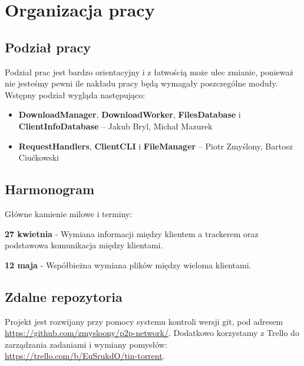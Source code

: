 \documentclass[11pt]{article}
\begin{document}
\clearpage
\section{Organizacja pracy}
\subsection{Podział pracy}
Podział prac jest bardzo orientacyjny i z łatwością może ulec zmianie, ponieważ nie jesteśmy pewni ile nakładu pracy będą wymagały poszczególne moduły. Wstępny podział wygląda następująco:
\begin{itemize}
\item \textbf{DownloadManager}, \textbf{DownloadWorker}, \textbf{FilesDatabase} i \textbf{ClientInfoDatabase} -- Jakub Bryl, Michał Mazurek
\item \textbf{RequestHandlers}, \textbf{ClientCLI} i \textbf{FileManager} -- Piotr Zmyślony, Bartosz Ciućkowski 
\end{itemize}
\subsection{Harmonogram}
Główne kamienie milowe i terminy:

\textbf{27 kwietnia} - Wymiana informacji między klientem a trackerem oraz podstawowa komunikacja między klientami. 

\textbf{12 maja} - Współbieżna wymiana plików między wieloma klientami. 

\subsection{Zdalne repozytoria}
Projekt jest rozwijany przy pomocy systemu kontroli wersji git, pod adresem \url{https://github.com/zmysloony/p2p-network/}. Dodatkowo korzystamy z Trello do zarządzania zadaniami i wymiany pomysłów: \url{https://trello.com/b/EuSrukdO/tin-torrent}.
\end{document}
